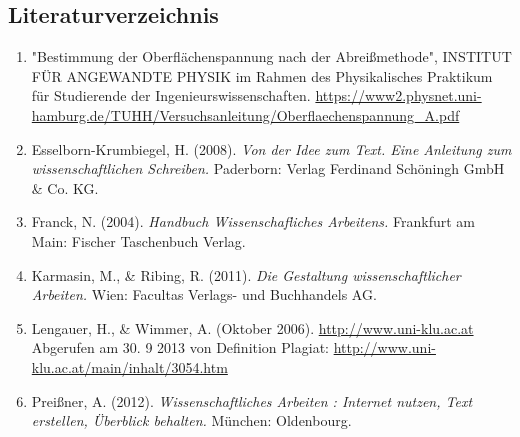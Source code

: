 \documentclass[twocolumn,10pt]{extarticle}
\begin{document}
\subsection{Literaturverzeichnis}
\begin{enumerate}
    \item "Bestimmung der Oberflächenspannung nach der Abreißmethode", INSTITUT FÜR ANGEWANDTE PHYSIK im Rahmen des Physikalisches Praktikum für Studierende der Ingenieurswissenschaften. 
    \url{https://www2.physnet.uni-hamburg.de/TUHH/Versuchsanleitung/Oberflaechenspannung_A.pdf}
    \item Esselborn-Krumbiegel, H. (2008). \textit{Von der Idee zum Text. Eine Anleitung zum wissenschaftlichen Schreiben.} Paderborn: Verlag Ferdinand Schöningh GmbH \& Co. KG.
     \item Franck, N. (2004). \textit{Handbuch Wissenschafliches Arbeitens.} Frankfurt am Main: Fischer Taschenbuch Verlag.	
    \item Karmasin, M., \& Ribing, R. (2011). \textit{Die Gestaltung wissenschaftlicher Arbeiten.} Wien: Facultas Verlags- und Buchhandels AG.
    \item Lengauer, H., \& Wimmer, A. (Oktober 2006). \url{http://www.uni-klu.ac.at} Abgerufen am 30. 9 2013 von Definition Plagiat: \url{http://www.uni-klu.ac.at/main/inhalt/3054.htm}
    \item Preißner, A. (2012). \textit{Wissenschaftliches Arbeiten : Internet nutzen, Text erstellen, Überblick behalten.} München: Oldenbourg.

    
\end{enumerate}
\end{document}
